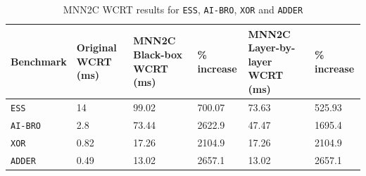 \begin{table}[H]
	\centering
	\caption{MNN2C \ac{WCRT} results for \texttt{ESS}, \texttt{AI-BRO}, \texttt{XOR} and \texttt{ADDER}}
	\label{tbl:res-mnn2c}
	\begin{tabular}{|p{}|p{}|p{}|p{}|p{}|p{}|}
		\hline
		Benchmark         & Original WCRT (ms) & MNN2C Black-box WCRT (ms)  &  \% increase & MNN2C Layer-by-layer WCRT (ms) & \% increase\\ \hline
		\texttt{ESS}        & 14 & 99.02 & 700.07 & 73.63 & 525.93 \\  \hline
		\texttt{AI-BRO}        & 2.8 & 73.44 & 2622.9 & 47.47 & 1695.4 \\ \hline
		\texttt{XOR}        & 0.82 & 17.26 & 2104.9 & 17.26 & 2104.9 \\  \hline
		\texttt{ADDER}        & 0.49 & 13.02 & 2657.1 & 13.02 & 2657.1 \\ \hline
	\end{tabular}
\end{table}

